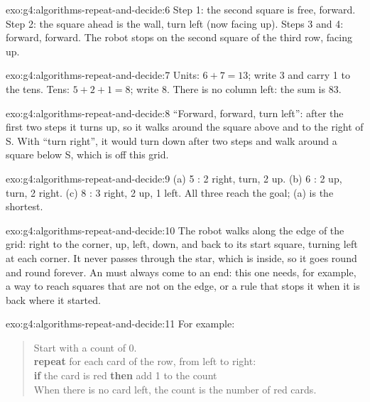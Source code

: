 \begin{solution}{exo:g4:algorithms-repeat-and-decide:6}
Step 1: the second square is free, forward. Step 2: the square ahead is the
wall, turn left (now facing up). Steps 3 and 4: forward, forward. The robot
stops on the second square of the third row, facing up.
\end{solution}

\begin{solution}{exo:g4:algorithms-repeat-and-decide:7}
Units: $6 + 7 = 13$; write 3 and carry 1 to the tens. Tens: $5 + 2 + 1 = 8$;
write 8. There is no column left: the sum is 83.
\end{solution}

\begin{solution}{exo:g4:algorithms-repeat-and-decide:8}
``Forward, forward, turn left'': after the first two steps it turns up, so it
walks around the square above and to the right of S. With ``turn right'', it
would turn down after two steps and walk around a square below S, which is off
this grid.
\end{solution}

\begin{solution}{exo:g4:algorithms-repeat-and-decide:9}
(a) 5 : 2 right, turn, 2 up. (b) 6 : 2 up, turn,
2 right. (c) 8 : 3 right, 2 up, 1 left. All three reach the goal;
(a) is the shortest.
\end{solution}

\begin{solution}{exo:g4:algorithms-repeat-and-decide:10}
The robot walks along the edge of the grid: right to the corner, up, left, down,
and back to its start square, turning left at each corner. It never passes
through the star, which is inside, so it goes round and round forever. An
 must always come to an end: this one needs, for example, a way to
reach squares that are not on the edge, or a rule that stops it when it is back
where it started.
\end{solution}

\begin{solution}{exo:g4:algorithms-repeat-and-decide:11}
For example:
\begin{quote}
Start with a count of 0.\\
\textbf{repeat} for each card of the row, from left to right:\\
\hspace*{1.5em}\textbf{if} the card is red \textbf{then} add 1 to the count\\
When there is no card left, the count is the number of red cards.
\end{quote}
\end{solution}
